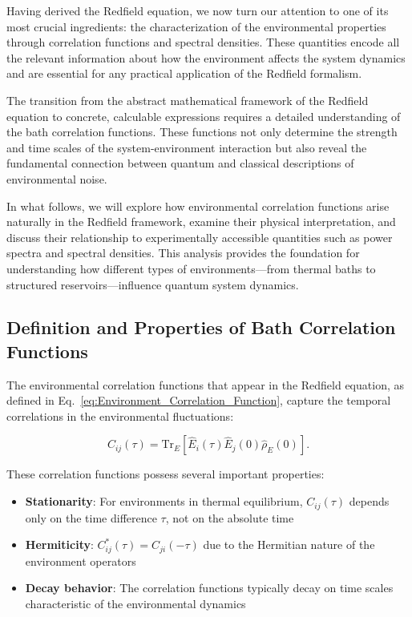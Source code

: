 Having derived the Redfield equation, we now turn our attention to one of its most crucial ingredients: the characterization of the environmental properties through correlation functions and spectral densities. These quantities encode all the relevant information about how the environment affects the system dynamics and are essential for any practical application of the Redfield formalism.

The transition from the abstract mathematical framework of the Redfield equation to concrete, calculable expressions requires a detailed understanding of the bath correlation functions. These functions not only determine the strength and time scales of the system-environment interaction but also reveal the fundamental connection between quantum and classical descriptions of environmental noise.

In what follows, we will explore how environmental correlation functions arise naturally in the Redfield framework, examine their physical interpretation, and discuss their relationship to experimentally accessible quantities such as power spectra and spectral densities. This analysis provides the foundation for understanding how different types of environments—from thermal baths to structured reservoirs—influence quantum system dynamics.

\subsection{Definition and Properties of Bath Correlation Functions}

The environmental correlation functions that appear in the Redfield equation, as defined in Eq.~\eqref{eq:Environment_Correlation_Function}, capture the temporal correlations in the environmental fluctuations:

\begin{equation}
    C_{ij}(\tau) = \mathrm{Tr}_E[\hat{E}_i(\tau) \hat{E}_j(0) \hat{\rho}_E(0)].
    \label{eq:bath_correlator_detailed}
\end{equation}

These correlation functions possess several important properties:

\begin{itemize}
    \item \textbf{Stationarity}: For environments in thermal equilibrium, $C_{ij}(\tau)$ depends only on the time difference $\tau$, not on the absolute time
    \item \textbf{Hermiticity}: $C_{ij}^*(\tau) = C_{ji}(-\tau)$ due to the Hermitian nature of the environment operators
    \item \textbf{Decay behavior}: The correlation functions typically decay on time scales characteristic of the environmental dynamics
\end{itemize}

